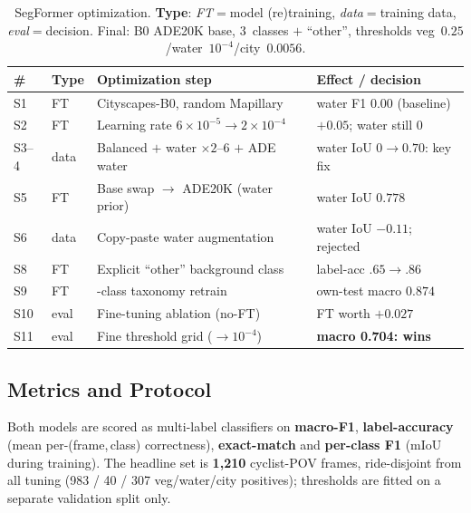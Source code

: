 \documentclass[letterpaper,journal]{IEEEtran}
\begin{document}
\begin{table}[!t]
\caption{SegFormer optimization. \textbf{Type}: \emph{FT}$=$model (re)training,
\emph{data}$=$training data, \emph{eval}$=$decision. Final: B0 ADE20K base,
3~classes $+$ ``other'', thresholds veg~$0.25$/water~$10^{-4}$/city~$0.0056$.}
\label{tab:seg-opt}
\centering
\scriptsize
\setlength{\tabcolsep}{2pt}
\renewcommand{\arraystretch}{1.0}
\begin{tabular}{@{}p{}>{\raggedright\arraybackslash}p{}>{\raggedright\arraybackslash}p{}>{\raggedright\arraybackslash}p{}@{}}
\toprule
\textbf{\#} & \textbf{Type} & \textbf{Optimization step} & \textbf{Effect / decision}\\
\midrule
S1 & FT & Cityscapes-B0, random Mapillary~\cite{mapillaryvistas} & water F1 $0.00$ (baseline)\\
S2 & FT & Learning rate $6\!\times\!10^{-5}{\to}2\!\times\!10^{-4}$ & $+0.05$; water still $0$\\
S3--4 & data & Balanced $+$ water $\times2\text{--}6$ $+$ ADE water~\cite{ade20k} & water IoU $0{\to}0.70$: key fix\\
S5 & FT & Base swap $\to$ ADE20K (water prior)~\cite{ade20k} & water IoU $0.778$\\
S6 & data & Copy-paste water augmentation & water IoU $-0.11$; rejected\\
S8 & FT & Explicit ``other'' background class & label-acc $.65{\to}.86$\\
S9 & FT & 3-class taxonomy retrain & own-test macro $0.874$\\
S10 & eval & Fine-tuning ablation (no-FT) & FT worth $+0.027$\\
S11 & eval & Fine threshold grid ($\to 10^{-4}$) & \textbf{macro 0.704: wins}\\
\bottomrule
\end{tabular}
\end{table}

\subsection{Metrics and Protocol}
Both models are scored as multi-label classifiers on \textbf{macro-F1},
\textbf{label-accuracy} (mean per-(frame,\,class) correctness), \textbf{exact-match}
and \textbf{per-class F1} (mIoU during training). The headline set is
\textbf{1{,}210} cyclist-POV frames, ride-disjoint from all tuning
(983 / 40 / 307 veg/water/city positives); thresholds are fitted on a separate
validation split only.
\end{document}
